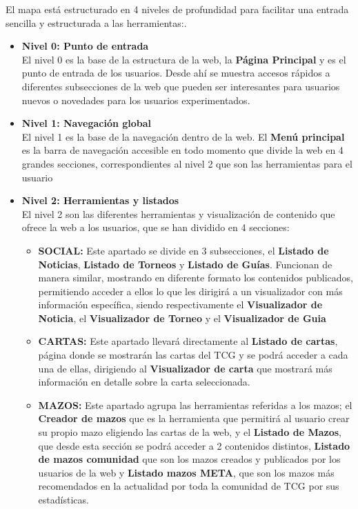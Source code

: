 \documentclass[10pt]{article}
\begin{document}
	El mapa está estructurado en 4 niveles de profundidad para facilitar una entrada sencilla y estructurada a las herramientas:.\\
	\begin{itemize}
		\item \textbf{Nivel 0: Punto de entrada}\\
			El nivel 0 es la base de la estructura de la web, la \textbf{Página Principal} y es el punto de entrada de los usuarios. Desde ahí se muestra accesos rápidos a diferentes subsecciones de la web que pueden ser interesantes para usuarios nuevos o novedades para los usuarios experimentados.\\
		\item \textbf{Nivel 1: Navegación global}\\
			El nivel 1 es la base de la navegación dentro de la web. El \textbf{Menú principal} es la barra de navegación accesible en todo momento que divide la web en 4 grandes secciones, correspondientes al nivel 2 que son las herramientas para el usuario\\
		\item \textbf{Nivel 2: Herramientas y listados}\\
			El nivel 2 son las diferentes herramientas y visualización de contenido que ofrece la web a los usuarios, que se han dividido en 4 secciones:
			\begin{itemize}
				\item \textbf{SOCIAL:} Este apartado se divide en 3 subsecciones, el \textbf{Listado de Noticias}, \textbf{Listado de Torneos} y \textbf{Listado de Guías}. Funcionan de manera similar, mostrando en diferente formato los contenidos publicados, permitiendo acceder a ellos lo que les dirigirá a un visualizador con más información específica, siendo respectivamente el \textbf{Visualizador de Noticia}, el \textbf{Visualizador de Torneo} y el \textbf{Visualizador de Guia}
				\item \textbf{CARTAS:} Este apartado llevará directamente al \textbf{Listado de cartas}, página donde se mostrarán las cartas del TCG y se podrá acceder a cada una de ellas, dirigiendo al \textbf{Visualizador de carta} que mostrará más información en detalle sobre la carta seleccionada.
				\item \textbf{MAZOS:} Este apartado agrupa las herramientas referidas a los mazos; el \textbf{Creador de mazos} que es la herramienta que permitirá al usuario crear su propio mazo eligiendo las cartas de la web, y el \textbf{Listado de Mazos}, que desde esta sección se podrá acceder a 2 contenidos distintos, \textbf{Listado de mazos comunidad} que son los mazos creados y publicados por los usuarios de la web y \textbf{Listado mazos META}, que son los mazos más recomendados en la actualidad por toda la comunidad de TCG por sus estadísticas.

\end{itemize}
\end{itemize}
\end{document}
